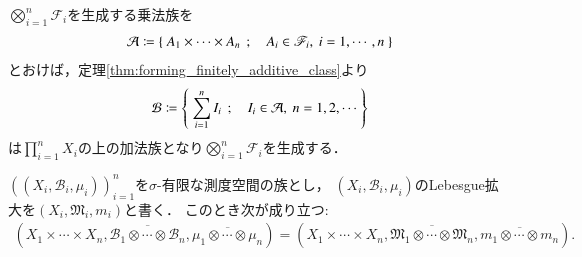 		\begin{prf}
			$\bigotimes_{i=1}^n \mathscr{F}_i$を生成する乗法族を
			\begin{align}
				\mathcal{A} \coloneqq
				\left\{\ A_1 \times \cdots \times A_n\ \, ; \quad A_i \in \mathscr{F}_i,\ i=1,\cdots,n\ \right\}
			\end{align}
			とおけば，定理\ref{thm:forming_finitely_additive_class}より
			\begin{align}
				\mathcal{B} \coloneqq \left\{\ \sum_{i=1}^n I_i\ \, ; \quad I_i \in \mathcal{A},\ n=1,2,\cdots\ \right\}
			\end{align}
			は$\prod_{i=1}^n X_i$の上の加法族となり$\bigotimes_{i=1}^n \mathscr{F}_i$を生成する．
		\end{prf}
		
		\begin{screen}
			\begin{thm}[完備測度空間の直積空間]\label{thm:product_space_of_complete_measure_space}
				$\left( (X_i,\mathcal{B}_i,\mu_i) \right)_{i=1}^n$を$\sigma$-有限な測度空間の族とし，
				$(X_i,\mathcal{B}_i,\mu_i)$のLebesgue拡大を$\left( X_i,\mathfrak{M}_i,m_i \right)$と書く．
				このとき次が成り立つ:
				\begin{align}
					\left( X_1 \times \cdots \times X_n, \overline{\mathcal{B}_1 \otimes \cdots \otimes \mathcal{B}_n}, \overline{\mu_1 \otimes \cdots \otimes \mu_n} \right)
					= \left( X_1 \times \cdots \times X_n, \overline{\mathfrak{M}_1 \otimes \cdots \otimes \mathfrak{M}_n}, \overline{m_1 \otimes \cdots \otimes m_n} \right).
				\end{align}
			\end{thm}
		\end{screen}
		

